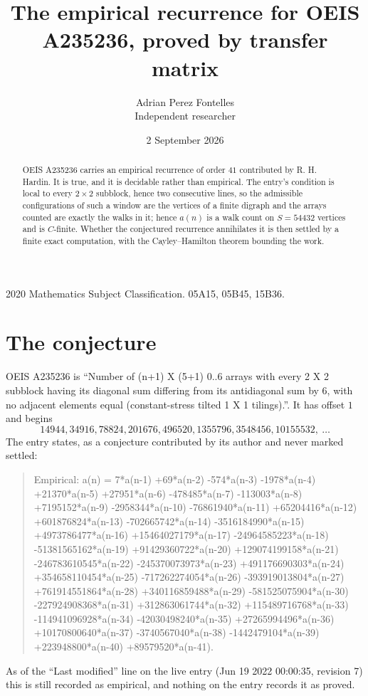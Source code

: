 \documentclass[11pt,a4paper]{article}
\title{The empirical recurrence for OEIS A235236, proved by transfer matrix}
\author{Adrian Perez Fontelles\\ \small Independent researcher}
\date{2 September 2026}
\theoremstyle{plain}
\theoremstyle{definition}
\begin{document}
\maketitle

\begin{abstract}
OEIS A235236 carries an empirical recurrence of order $41$ contributed by R. H. Hardin. It is
true, and it is decidable rather than empirical. The entry's condition is local to every $2\times2$ subblock, hence two consecutive lines, so
the admissible configurations of such a window are the vertices of a finite digraph and the
arrays counted are exactly the walks in it; hence $a(n)$ is a walk count on $S=54432$ vertices
and is $C$-finite. Whether the conjectured recurrence annihilates it is then settled by a
finite exact computation, with the Cayley--Hamilton theorem bounding the work.
\end{abstract}

\noindent\small 2020 Mathematics Subject Classification. 05A15, 05B45, 15B36.\normalsize

\section{The conjecture}

OEIS A235236 is ``Number of (n+1) X (5+1) 0..6 arrays with every 2 X 2 subblock having its diagonal sum differing from its antidiagonal sum by 6, with no adjacent elements equal (constant-stress tilted 1 X 1 tilings).''. It has offset $1$ and begins
\[
14944, 34916, 78824, 201676, 496520, 1355796, 3548456, 10155532,\ \dots
\]
The entry states, as a conjecture contributed by its author and never marked settled:
\begin{quote}
Empirical: a(n) = 7*a(n-1) +69*a(n-2) -574*a(n-3) -1978*a(n-4) +21370*a(n-5) +27951*a(n-6) -478485*a(n-7) -113003*a(n-8) +7195152*a(n-9) -2958344*a(n-10) -76861940*a(n-11) +65204416*a(n-12) +601876824*a(n-13) -702665742*a(n-14) -3516184990*a(n-15) +4973786477*a(n-16) +15464027179*a(n-17) -24964585223*a(n-18) -51381565162*a(n-19) +91429360722*a(n-20) +129074199158*a(n-21) -246783610545*a(n-22) -245370073973*a(n-23) +491176690303*a(n-24) +354658110454*a(n-25) -717262274054*a(n-26) -393919013804*a(n-27) +761914551864*a(n-28) +340116859488*a(n-29) -581525075904*a(n-30) -227924908368*a(n-31) +312863061744*a(n-32) +115489716768*a(n-33) -114941096928*a(n-34) -42030498240*a(n-35) +27265994496*a(n-36) +10170800640*a(n-37) -3740567040*a(n-38) -1442479104*a(n-39) +223948800*a(n-40) +89579520*a(n-41).
\end{quote}
As of the ``Last modified'' line on the live entry (Jun 19 2022 00:00:35, revision 7) this is still
recorded as empirical, and nothing on the entry records it as proved.
\end{document}
